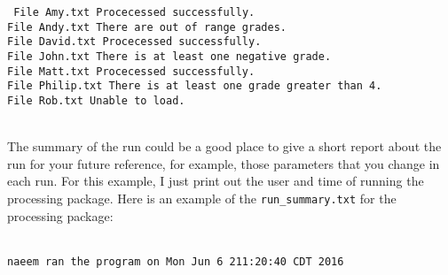 \begin{mdframed}[hidealllines=true,backgroundcolor=gray!20]
\begin{singlespace}
\fontsize{10pt}{1pt}
\texttt{
File  Amy.txt Procecessed successfully.\\
File  Andy.txt There are out of range grades.\\
File  David.txt Procecessed successfully.\\
File  John.txt There is at least one negative grade.\\
File  Matt.txt Procecessed successfully.\\
File  Philip.txt There is at least one grade greater than 4.\\
File  Rob.txt Unable to load.\\
\\
}
\end{singlespace}
\end{mdframed}
\noindent
The summary of the run could be a good place to give a short report about the run for your future reference, for example, those parameters that you change in each run.
For this example, I just print out the user and time of running the processing package. Here is an example of the \texttt{run\_summary.txt} for the processing package:

\begin{mdframed}[hidealllines=true,backgroundcolor=gray!20]
\fontsize{10pt}{1pt}
\texttt{
\\
naeem ran the program on Mon Jun 6 211:20:40 CDT 2016
\\
}
\end{mdframed}


